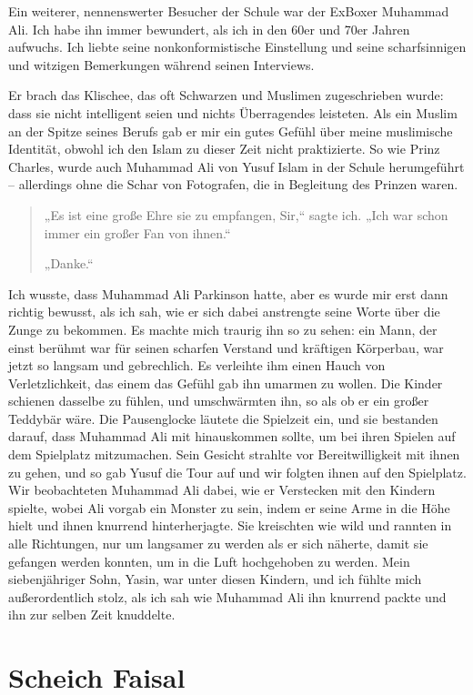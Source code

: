 \documentclass[12pt]{memoir}
\begin{document}
Ein weiterer, nennenswerter Besucher der Schule war der Ex\–Boxer Muhammad Ali.
Ich habe ihn immer bewundert, als ich in den 60er und 70er Jahren aufwuchs.
Ich liebte seine nonkonformistische Einstellung
und seine scharfsinnigen und witzigen Bemerkungen während seinen Interviews.

Er brach das Klischee, das oft Schwarzen und Muslimen zugeschrieben wurde:
dass sie nicht intelligent seien und nichts Überragendes leisteten.
Als ein Muslim an der Spitze seines Berufs
gab er mir ein gutes Gefühl über meine muslimische Identität,
obwohl ich den Islam zu dieser Zeit nicht praktizierte.
So wie Prinz Charles, wurde auch Muhammad Ali
von Yusuf Islam in der Schule herumgeführt –
allerdings ohne die Schar von Fotografen,
die in Begleitung des Prinzen waren.

\begin{quote}
„Es ist eine große Ehre sie zu empfangen, Sir,“ sagte ich.
„Ich war schon immer ein großer Fan von ihnen.“

„Danke.“
\end{quote}

Ich wusste, dass Muhammad Ali Parkinson hatte,
aber es wurde mir erst dann richtig bewusst, als ich sah,
wie er sich dabei anstrengte seine Worte über die Zunge zu bekommen.
Es machte mich traurig ihn so zu sehen:
ein Mann, der einst berühmt war
für seinen scharfen Verstand und kräftigen Körperbau,
war jetzt so langsam und gebrechlich.
Es verleihte ihm einen Hauch von Verletzlichkeit,
das einem das Gefühl gab ihn umarmen zu wollen.
Die Kinder schienen dasselbe zu fühlen,
und umschwärmten ihn, so als ob er ein großer Teddybär wäre.
Die Pausenglocke läutete die Spielzeit ein, und sie bestanden darauf,
dass Muhammad Ali mit hinauskommen sollte,
um bei ihren Spielen auf dem Spielplatz mitzumachen.
Sein Gesicht strahlte vor Bereitwilligkeit mit ihnen zu gehen,
und so gab Yusuf die Tour auf und wir folgten ihnen auf den Spielplatz.
Wir beobachteten Muhammad Ali dabei,
wie er Verstecken mit den Kindern spielte,
wobei Ali vorgab ein Monster zu sein, indem er seine Arme in die Höhe hielt
und ihnen knurrend hinterherjagte.
Sie kreischten wie wild und rannten in alle Richtungen,
nur um langsamer zu werden als er sich näherte,
damit sie gefangen werden konnten,
um in die Luft hochgehoben zu werden.
Mein siebenjähriger Sohn, Yasin, war unter diesen Kindern,
und ich fühlte mich außerordentlich stolz,
als ich sah wie Muhammad Ali ihn knurrend packte
und ihn zur selben Zeit knuddelte.

\chapter{Scheich Faisal}
\end{document}
